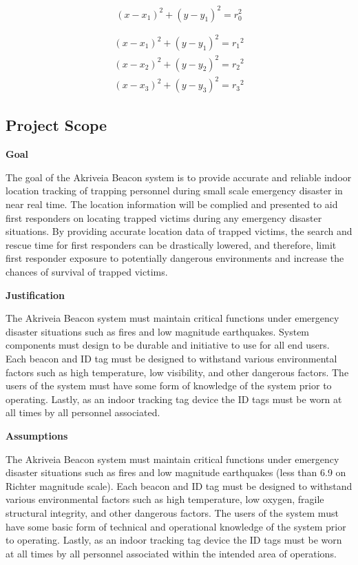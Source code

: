 \medskip
\begin{equation}
	(x-x_{1})^2 + (y-y_{1})^2 = r_{0}^2
\end{equation}

\begin{gather}
	(x-x_1)^2 + (y-y_1)^2 = {r_1}^2 \\
	\nonumber (x-x_2)^2 + (y-y_2)^2 = {r_2}^2 \\
	\nonumber (x-x_3)^2 + (y-y_3)^2 = {r_3}^2  
\end{gather}


\pagebreak
\subsection{Project Scope}

\medskip
\textbf{Goal}

\medskip
The goal of the Akriveia Beacon system is to provide accurate and reliable indoor location tracking of trapping personnel during small scale emergency disaster in near real time. The location information will be complied and presented to aid first responders on locating trapped victims during any emergency disaster situations. By providing accurate location data of trapped victims, the search and rescue time for first responders can be drastically lowered, and therefore, limit first responder exposure to potentially dangerous environments and increase the chances of survival of trapped victims.

\bigskip
\textbf{Justification}

\medskip
The Akriveia Beacon system must maintain critical functions under emergency disaster situations such as fires and low magnitude earthquakes. System components must design to be durable and initiative to use for all end users. Each beacon and ID tag must be designed to withstand various environmental factors such as high temperature, low visibility, and other dangerous factors. The users of the system must have some form of knowledge of the system prior to operating. Lastly, as an indoor tracking tag device the ID tags must be worn at all times by all personnel associated.

\bigskip
\textbf{Assumptions}

\medskip
The Akriveia Beacon system must maintain critical functions under emergency disaster situations such as fires and low magnitude earthquakes (less than 6.9 on Richter magnitude scale). Each beacon and ID tag must be designed to withstand various environmental factors such as high temperature, low oxygen, fragile structural integrity, and other dangerous factors. The users of the system must have some basic form of technical and operational knowledge of the system prior to operating. Lastly, as an indoor tracking tag device the ID tags must be worn at all times by all personnel associated within the intended area of operations.


